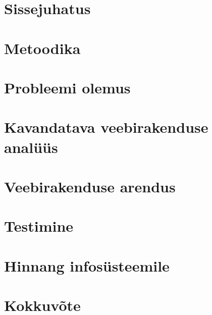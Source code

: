 \chapter{Sissejuhatus}\label{chapter:introduction}


\chapter{Metoodika}\label{chapter:metodology}


\chapter{Probleemi olemus}\label{chapter:problem_statement}


\chapter{Kavandatava veebirakenduse analüüs}\label{chapter:analysis}


\chapter{Veebirakenduse arendus}\label{chapter:development}


\chapter{Testimine}\label{chapter:testing} 


\chapter{Hinnang infosüsteemile}\label{chapter:feedback} 



\chapter{Kokkuvõte}\label{chapter:summary} 
